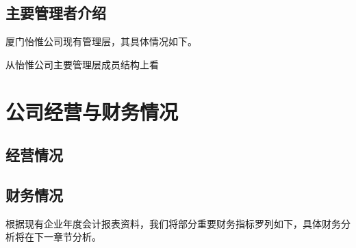 \subsection{主要管理者介绍}
厦门怡惟公司现有管理层，其具体情况如下。\\
\vspace{1ex}

\begin{mdfbox}[吴雪颖]
\end{mdfbox}

从怡惟公司主要管理层成员结构上看
\section{公司经营与财务情况}
\subsection{经营情况}




\subsection{财务情况}
根据现有企业年度会计报表资料，我们将部分重要财务指标罗列如下，具体财务分析将在下一章节分析。

